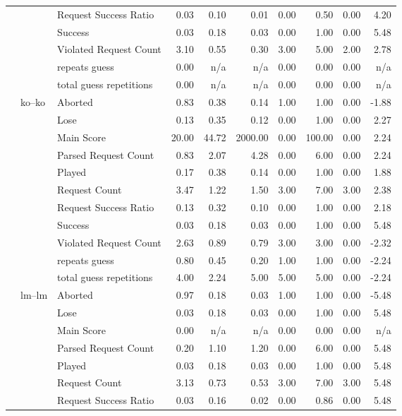 \begin{tabular}{lllrrrrrrr}
 &  & Request Success Ratio & 0.03 & 0.10 & 0.01 & 0.00 & 0.50 & 0.00 & 4.20 \\
 &  & Success & 0.03 & 0.18 & 0.03 & 0.00 & 1.00 & 0.00 & 5.48 \\
 &  & Violated Request Count & 3.10 & 0.55 & 0.30 & 3.00 & 5.00 & 2.00 & 2.78 \\
 &  & repeats guess & 0.00 & n/a & n/a & 0.00 & 0.00 & 0.00 & n/a \\
 &  & total guess repetitions & 0.00 & n/a & n/a & 0.00 & 0.00 & 0.00 & n/a \\
\cline{2-10}
 & \multirow[t]{11}{*}{ko--ko} & Aborted & 0.83 & 0.38 & 0.14 & 1.00 & 1.00 & 0.00 & -1.88 \\
 &  & Lose & 0.13 & 0.35 & 0.12 & 0.00 & 1.00 & 0.00 & 2.27 \\
 &  & Main Score & 20.00 & 44.72 & 2000.00 & 0.00 & 100.00 & 0.00 & 2.24 \\
 &  & Parsed Request Count & 0.83 & 2.07 & 4.28 & 0.00 & 6.00 & 0.00 & 2.24 \\
 &  & Played & 0.17 & 0.38 & 0.14 & 0.00 & 1.00 & 0.00 & 1.88 \\
 &  & Request Count & 3.47 & 1.22 & 1.50 & 3.00 & 7.00 & 3.00 & 2.38 \\
 &  & Request Success Ratio & 0.13 & 0.32 & 0.10 & 0.00 & 1.00 & 0.00 & 2.18 \\
 &  & Success & 0.03 & 0.18 & 0.03 & 0.00 & 1.00 & 0.00 & 5.48 \\
 &  & Violated Request Count & 2.63 & 0.89 & 0.79 & 3.00 & 3.00 & 0.00 & -2.32 \\
 &  & repeats guess & 0.80 & 0.45 & 0.20 & 1.00 & 1.00 & 0.00 & -2.24 \\
 &  & total guess repetitions & 4.00 & 2.24 & 5.00 & 5.00 & 5.00 & 0.00 & -2.24 \\
\cline{2-10}
 & \multirow[t]{11}{*}{lm--lm} & Aborted & 0.97 & 0.18 & 0.03 & 1.00 & 1.00 & 0.00 & -5.48 \\
 &  & Lose & 0.03 & 0.18 & 0.03 & 0.00 & 1.00 & 0.00 & 5.48 \\
 &  & Main Score & 0.00 & n/a & n/a & 0.00 & 0.00 & 0.00 & n/a \\
 &  & Parsed Request Count & 0.20 & 1.10 & 1.20 & 0.00 & 6.00 & 0.00 & 5.48 \\
 &  & Played & 0.03 & 0.18 & 0.03 & 0.00 & 1.00 & 0.00 & 5.48 \\
 &  & Request Count & 3.13 & 0.73 & 0.53 & 3.00 & 7.00 & 3.00 & 5.48 \\
 &  & Request Success Ratio & 0.03 & 0.16 & 0.02 & 0.00 & 0.86 & 0.00 & 5.48 \\

\end{tabular}
